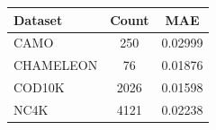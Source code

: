 \begin{tabular}{lcc}
\toprule
Dataset & Count & MAE \\
\midrule
CAMO & 250 & 0.02999 \\
CHAMELEON & 76 & 0.01876 \\
COD10K & 2026 & 0.01598 \\
NC4K & 4121 & 0.02238 \\
\bottomrule
\end{tabular}
